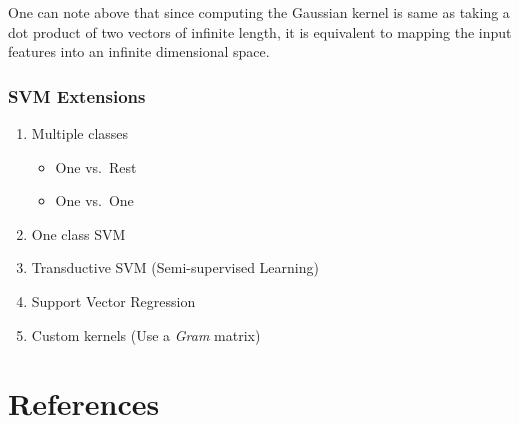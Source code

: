 \documentclass[10pt]{beamer}
\begin{document}
    {
      One can note above that since computing the Gaussian kernel is same as taking a dot product of two vectors of infinite length, it is equivalent to mapping the input features into an infinite dimensional space.
    }
\begin{frame}
\frametitle{SVM Extensions}
\begin{enumerate}
  \item Multiple classes
    \begin{itemize}
      \item One vs.~Rest
      \item One vs.~One
    \end{itemize}
  \item One class SVM
  \item Transductive SVM (Semi-supervised Learning)
  \item Support Vector Regression
  \item Custom kernels (Use a {\em Gram} matrix)
\end{enumerate}
\end{frame}
\section*{References}
\label{sec:references}
\begin{frame}%
%  
%  
\end{frame}
\end{document}
